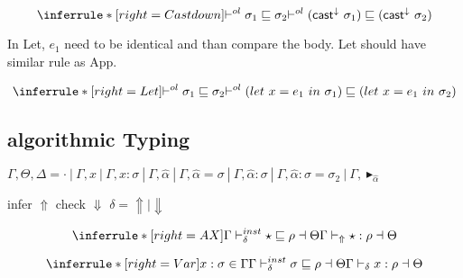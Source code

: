 \[
\inferrule*[right=Castdown]
{
 \olpolymorphic {\sigma_1} {\sigma_2}}
 { \olpolymorphic {(\castdowne \sigma_1)} {(\castdowne \sigma_2)}}
\]

In Let, $e_1$ need to be identical and than compare the body. Let should have similar rule as App.

\[
\inferrule*[right=Let]
{
\olpolymorphic {\sigma_1} {\sigma_2 }}
{\olpolymorphic {(let\ x = e_1\ in\ \sigma_1)} {(let\ x = e_1\ in\ \sigma_2) }}
\]


\clearpage

\fi

\subsection{algorithmic Typing}

\newcommand{\checktype}{\Gamma\vdash_\Downarrow}
\newcommand{\infertype}{\Gamma\vdash_\Uparrow}
\newcommand{\infercheck}{\Gamma\vdash_\delta}

\newcommand{\checktypeno}{\vdash_\Downarrow}
\newcommand{\infertypeno}{\vdash_\Uparrow}
\newcommand{\infercheckno}{\vdash_\delta}

\newcommand{\instinfer}{\vdash^{inst}_\Uparrow}
\newcommand{\instcheck}{\vdash^{inst}_\Downarrow}
\newcommand{\instinfercheck}{\vdash^{inst}_\delta}

\newcommand{\polyinfer}{\Gamma\vdash^{poly}_\Uparrow}
\newcommand{\polycheck}{\Gamma\vdash^{poly}_\Downarrow}
\newcommand{\polycheckno}{\vdash^{poly}_\Downarrow}
\newcommand{\polyinfercheck}{\vdash^{poly}_\delta}

\newcommand{\dsk}{\vdash^{dsk}}

\newcommand{\unify}{\vdash^{unify}}


$\Gamma, \Theta, \Delta  = \cdot~|~\Gamma, x~|~\Gamma, x:\sigma~|~\Gamma, \widehat{\alpha}~|~\Gamma, \widehat{\alpha}=\sigma~|~\Gamma, \widehat{\alpha}:\sigma~|~\Gamma, \widehat{\alpha}:\sigma = \sigma_2~|~\Gamma, \blacktriangleright_{\widehat \alpha}$

\framebox{$ \infercheck e : \rho \dashv \Theta $ } infer $\Uparrow$ check $\Downarrow$ $\delta = \Uparrow \mid \Downarrow$

\[
\inferrule*[right=AX]
{\Gamma \instinfercheck \star \sqsubseteq \rho \dashv \Theta}
{\infertype \star : \rho \dashv \Theta}
\]

\[
\inferrule*[right=Var]
{x:\sigma \in \Gamma \\ \Gamma \instinfercheck \sigma \sqsubseteq \rho \dashv \Theta }
{\infercheck x : \rho \dashv \Theta}
\]


